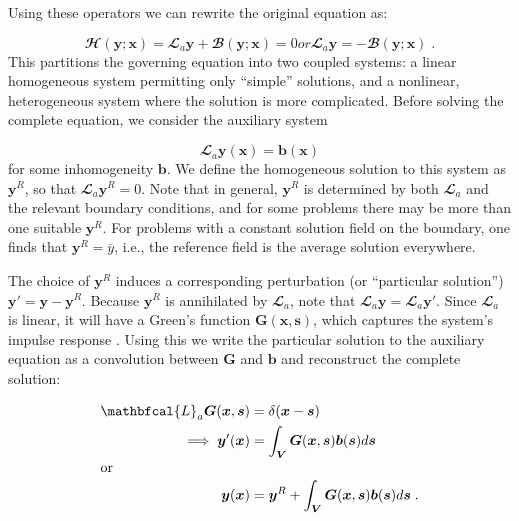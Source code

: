 \documentclass[3p, preprint]{elsarticle}
\newcommand{\bmx}{\bm{x}}
\newcommand{\bms}{\bm{s}}
\newcommand{\bmy}{\bm{y}}
\newcommand{\Gop}{\bm{G}}
\newcommand{\Linop}{\mathbfcal{L}}
\newcommand{\Aop}{\Linop_a}
\newcommand{\Hop}{\mathbfcal{H}}
\newcommand{\Bop}{\mathbfcal{B}}
\newenvironment{revision} {} {}
\begin{document}
Using these operators we can rewrite the original equation as: 

\begin{subequations}
\begin{equation}
\Hop(\bmy; \bmx) = \Aop \bmy + \Bop(\bmy; \bmx) = 0
\label{eq:cons1}
\end{equation}
or 
\begin{equation}
\Aop \bmy = -\Bop(\bmy; \bmx) \;.
\label{eq:cons2}
\end{equation}
\end{subequations}
\noindent This partitions the governing equation into two coupled systems: a linear homogeneous system permitting only ``simple'' solutions, and a nonlinear, heterogeneous system where the solution is more complicated. Before solving the complete equation, we consider the auxiliary system

\begin{equation}
\Aop \bmy(\bmx) = \bm{b}(\bmx)
\label{eq:axueq}
\end{equation}
\noindent for some inhomogeneity $\bm b$. We define the homogeneous solution to this system as $\bmy^R$, so that $\Aop \bmy^R = 0$. Note that in general, $\bmy^R$ is determined by both $\Aop$ and the relevant boundary conditions, and for some problems there may be more than one suitable $\bmy^R$. For problems with a constant solution field on the boundary, one finds that $\bmy^R = \overline{y}$, i.e.,  the reference field is the average solution everywhere.

The choice of $\bmy^R$ induces a corresponding perturbation (or ``particular solution'') $\bmy' = \bmy - \bmy^R$. Because $\bmy^R$ is annihilated by $\Aop$, note that $\Aop \bmy = \Aop \bmy'$. Since $\Aop$ is linear, it will have a Green's function $\Gop(\bmx, \bms)$, which captures the system's impulse response \cite{eisler_1969}. \begin{revision} Using this we write the particular solution to the auxiliary equation as a convolution between $\Gop$ and $\bm{b}$ and reconstruct the complete solution:\end{revision}

\begin{align}
\Aop \Gop(\bmx, \bms) &= \delta(\bmx - \bms) \\
\implies \bmy'(\bmx) &= \int_{\bm{V}} \bm{G}(\bmx, \bms) \bm{b}(\bms) d\bms \\
\intertext{or}
\bmy(\bmx) &= \bmy^R +  \int_{\bm{V}} \bm{G}(\bmx, \bms) \bm{b}(\bms) d\bms \;.
\label{eq:LSaux}
\end{align}
\end{document}
